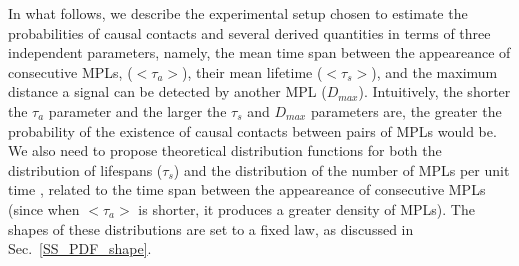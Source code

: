 \documentclass[crop]{CSLB}%
\begin{document}
In what follows, we describe the experimental setup chosen to estimate
the probabilities of causal contacts and several derived quantities in
terms of three independent parameters, namely, the mean time span
between the appeareance of consecutive MPLs, ($<\tau_a>$), their mean
lifetime ($<\tau_s>$), and the maximum distance a signal can be
detected by another MPL ($D_{max}$).
%
Intuitively, the shorter the $\tau_a$ parameter and the larger the
$\tau_s$ and $D_{max}$ parameters are, the greater the probability of
the existence of causal contacts between pairs of MPLs would be.
%
We also need to propose theoretical distribution functions for both
the distribution of lifespans ($\tau_s$) and the distribution of the
number of MPLs per unit time \citep{maccone_evolution_2014,
Sotos_biotechnology_2019}, related to the time span between the
appeareance of consecutive MPLs (since when $<\tau_a>$ is shorter, it
produces a greater density of MPLs).
%
The shapes of these distributions are set to a fixed law, as discussed
in Sec.~\ref{SS_PDF_shape}.
\end{document}
